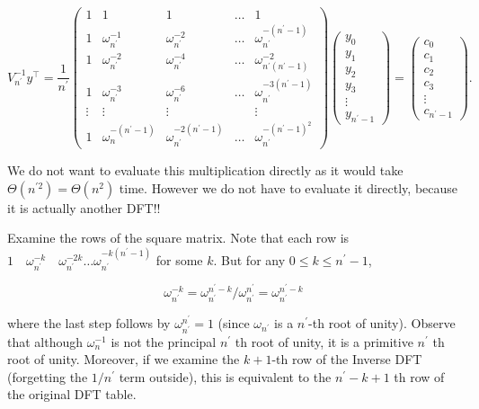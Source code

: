 $$
V_{n^{\prime}}^{-1} y^{\top}=\frac{1}{n^{\prime}}\left(\begin{array}{ccccc}
1 & 1 & 1 & \ldots & 1 \\
1 & \omega_{n^{\prime}}^{-1} & \omega_{n^{\prime}}^{-2} & \ldots & \omega_{n^{\prime}}^{-\left(n^{\prime}-1\right)} \\
1 & \omega_{n^{\prime}}^{-2} & \omega_{n^{\prime}}^{-4} & \ldots & \omega_{n^{\prime}\left(n^{\prime}-1\right)}^{-2} \\
1 & \omega_{n^{\prime}}^{-3} & \omega_{n^{\prime}}^{-6} & \ldots & \omega_{n^{\prime}}^{-3\left(n^{\prime}-1\right)} \\
\vdots & \vdots & \vdots & & \vdots \\
1 & \omega_{n}^{-\left(n^{\prime}-1\right)} & \omega_{n^{\prime}}^{-2\left(n^{\prime}-1\right)} & \ldots & \omega_{n^{\prime}}^{-\left(n^{\prime}-1\right)^{2}}
\end{array}\right)\left(\begin{array}{c}
y_{0} \\
y_{1} \\
y_{2} \\
y_{3} \\
\vdots \\
y_{n^{\prime}-1}
\end{array}\right)=\left(\begin{array}{c}
c_{0} \\
c_{1} \\
c_{2} \\
c_{3} \\
\vdots \\
c_{n^{\prime}-1}
\end{array}\right) .
$$

We do not want to evaluate this multiplication directly as it would take $\Theta\left(n^{\prime 2}\right)=\Theta\left(n^{2}\right)$ time. However we do not have to evaluate it directly, because it is actually another DFT!!

Examine the rows of the square matrix. Note that each row is $1 \quad \omega_{n^{\prime}}^{-k} \quad \omega_{n^{\prime}}^{-2 k} \ldots \omega_{n^{\prime}}^{-k\left(n^{\prime}-1\right)}$ for some $k$. But for any $0 \leq k \leq n^{\prime}-1$,

$$
\omega_{n^{\prime}}^{-k}=\omega_{n^{\prime}}^{n^{\prime}-k} / \omega_{n^{\prime}}^{n^{\prime}}=\omega_{n^{\prime}}^{n^{\prime}-k}
$$

where the last step follows by $\omega_{n^{\prime}}^{n^{\prime}}=1$ (since $\omega_{n^{\prime}}$ is a $n^{\prime}$-th root of unity). Observe that although $\omega_{n}^{-1}$ is not the principal $n^{\prime}$ th root of unity, it is a primitive $n^{\prime}$ th root of unity. Moreover, if we examine the $k+1$-th row of the Inverse DFT (forgetting the $1 / n^{\prime}$ term outside), this is equivalent to the $n^{\prime}-k+1$ th row of the original DFT table.

